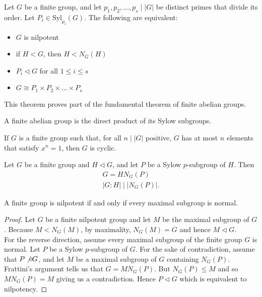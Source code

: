\documentclass{memoir}
\begin{document}
\begin{thm}
	Let \(G\) be a finite group, and let \(p_1,p_2,\ldots,p_s\mid \left| G \right| \) be distinct primes that divide its order. Let \(P_i \in \textrm{Syl}_{p_i}(G)\). The following are equivalent:
	\begin{itemize}
		\item \(G\) is nilpotent
		\item if \(H<G\), then \(H <  N_G(H)\)
		\item \(P_i \triangleleft G\) for all \(1\leq i\leq s\) 
		\item \(G \cong P_1\times P_2\times \ldots\times P_s\)
	\end{itemize}
\end{thm}
This theorem proves part of the fundamental theorem of finite abelian groups.

\begin{cor}
	A finite abelian group is the direct product of its Sylow subgroups.
\end{cor}

\begin{prop}
	If \(G\) is a finite group such that, for all \(n\mid \left| G \right| \) positive, \(G\) has at most \(n\) elements that satisfy \(x^{n}=1\), then \(G\) is cyclic.
\end{prop}
\begin{prop}
	Let \(G\) be a finite group and \(H \triangleleft G\), and let \(P\) be a Sylow \(p\)-subgroup of \(H\). Then
	\begin{align*}
		G = HN_G(P)\\
		\left| G : H \right| \mid \left| N_G(P) \right| .
	\end{align*}
\end{prop}

\begin{prop}
	A finite group is nilpotent if and only if every maximal subgroup is normal.
\end{prop}
\begin{proof}
	Let \(G\) be a finite nilpotent group and let \(M\) be the maximal subgroup of \(G\). Because \(M < N_G(M)\), by maximality, \(N_G(M) = G\) and hence \(M \triangleleft G\).\\

	For the reverse direction, assume every maximal subgroup of the finite group \(G\) is normal. Let \(P\) be a Sylow \(p\)-subgroup of \(G\). For the sake of contradiction, assume that \(P \not\triangleleft G\), and let \(M\) be a maximal subgroup of \(G\) containing \(N_G(P)\). Frattini's argument tells us that \(G = MN_G(P)\). But \(N_G(P) \leq M\) and so \(MN_G(P) = M\) giving us a contradiction. Hence \(P \triangleleft G\) which is equivalent to nilpotency.
\end{proof}
\end{document}
